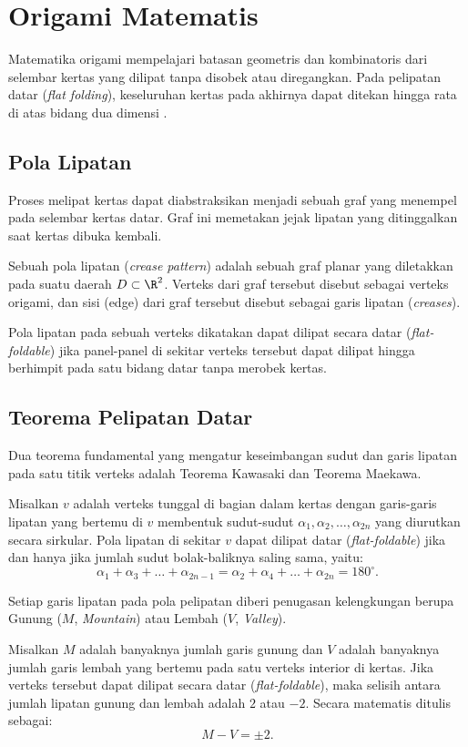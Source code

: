 \section{Origami Matematis}
Matematika origami mempelajari batasan geometris dan kombinatoris dari selembar kertas yang dilipat tanpa disobek atau diregangkan. Pada pelipatan datar (\textit{flat folding}), keseluruhan kertas pada akhirnya dapat ditekan hingga rata di atas bidang dua dimensi \parencite{hull2012project}.

\subsection{Pola Lipatan}
Proses melipat kertas dapat diabstraksikan menjadi sebuah graf yang menempel pada selembar kertas datar. Graf ini memetakan jejak lipatan yang ditinggalkan saat kertas dibuka kembali.
\begin{definisi}
  Sebuah pola lipatan (\textit{crease pattern}) adalah sebuah graf planar yang diletakkan pada suatu daerah $D \subset \R^2$. Verteks dari graf tersebut disebut sebagai verteks origami, dan sisi (edge) dari graf tersebut disebut sebagai garis lipatan (\textit{creases}).
\end{definisi}

Pola lipatan pada sebuah verteks dikatakan dapat dilipat secara datar (\textit{flat-foldable}) jika panel-panel di sekitar verteks tersebut dapat dilipat hingga berhimpit pada satu bidang datar tanpa merobek kertas.

\subsection{Teorema Pelipatan Datar}
Dua teorema fundamental yang mengatur keseimbangan sudut dan garis lipatan pada satu titik verteks adalah Teorema Kawasaki dan Teorema Maekawa.
\begin{teorema}
  Misalkan $v$ adalah verteks tunggal di bagian dalam kertas dengan garis-garis lipatan yang bertemu di $v$ membentuk sudut-sudut $\alpha_1, \alpha_2, \ldots, \alpha_{2n}$ yang diurutkan secara sirkular. Pola lipatan di sekitar $v$ dapat dilipat datar (\textit{flat-foldable}) jika dan hanya jika jumlah sudut bolak-baliknya saling sama, yaitu:
  \[
    \alpha_1 + \alpha_3 + \ldots + \alpha_{2n-1} = \alpha_2 + \alpha_4 + \ldots + \alpha_{2n} = 180^\circ.
  \]
\end{teorema}

Setiap garis lipatan pada pola pelipatan diberi penugasan kelengkungan berupa Gunung ($M$, \textit{Mountain}) atau Lembah ($V$, \textit{Valley}).
\begin{teorema}
  Misalkan $M$ adalah banyaknya jumlah garis gunung dan $V$ adalah banyaknya jumlah garis lembah yang bertemu pada satu verteks interior di kertas. Jika verteks tersebut dapat dilipat secara datar (\textit{flat-foldable}), maka selisih antara jumlah lipatan gunung dan lembah adalah $2$ atau $-2$. Secara matematis ditulis sebagai:
  \[
    M - V = \pm 2.
  \]
\end{teorema}

